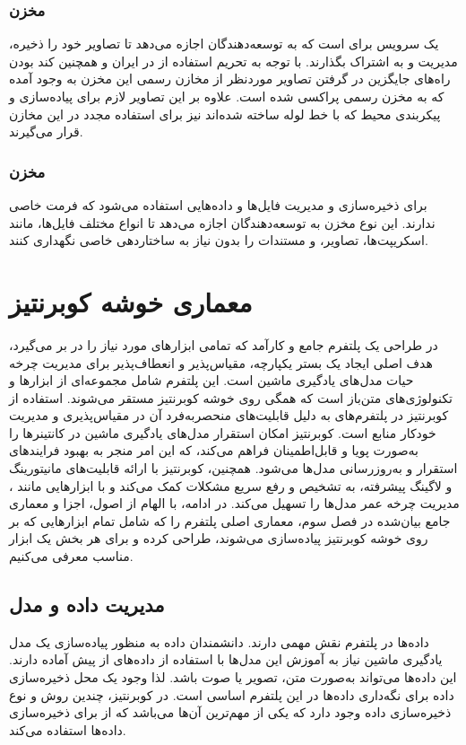 \subsubsection{مخزن }
یک سرویس برای  است که به توسعه‌دهندگان اجازه می‌دهد تا تصاویر خود را ذخیره، مدیریت و به اشتراک بگذارند. با توجه به تحریم استفاده از  در ایران و همچنین کند بودن راه‌های جایگزین در گرفتن تصاویر موردنظر از مخازن رسمی این مخزن به وجود آمده که به مخزن رسمی  پراکسی شده است. علاوه بر این تصاویر لازم برای پیاده‌سازی و پیکربندی محیط که با خط لوله  ساخته شده‌اند نیز برای استفاده مجدد در این مخازن قرار می‌گیرند.
\subsubsection{مخزن }
برای ذخیره‌سازی و مدیریت فایل‌ها و داده‌هایی استفاده می‌شود که فرمت خاصی ندارند. این نوع مخزن به توسعه‌دهندگان اجازه می‌دهد تا انواع مختلف فایل‌ها، مانند اسکریپت‌ها، تصاویر، و مستندات را بدون نیاز به ساختاردهی خاصی نگهداری کنند.


\section{معماری خوشه کوبرنتیز}
در طراحی یک پلتفرم  جامع و کارآمد که تمامی ابزارهای مورد نیاز را در بر می‌گیرد، هدف اصلی ایجاد یک بستر یکپارچه، مقیاس‌پذیر و انعطاف‌پذیر برای مدیریت چرخه حیات مدل‌های یادگیری ماشین است. این پلتفرم شامل مجموعه‌ای از ابزارها و تکنولوژی‌های متن‌باز است که همگی روی خوشه کوبرنتیز مستقر می‌شوند. استفاده از کوبرنتیز در پلتفرم‌های  به دلیل قابلیت‌های منحصربه‌فرد آن در مقیاس‌پذیری و مدیریت خودکار منابع است. کوبرنتیز امکان استقرار مدل‌های یادگیری ماشین در کانتینرها را به‌صورت پویا و قابل‌اطمینان فراهم می‌کند، که این امر منجر به بهبود فرایندهای استقرار و به‌روزرسانی مدل‌ها می‌شود. همچنین، کوبرنتیز با ارائه قابلیت‌های مانیتورینگ و لاگینگ پیشرفته، به تشخیص و رفع سریع مشکلات کمک می‌کند و با ابزارهایی مانند ، مدیریت چرخه عمر مدل‌ها را تسهیل می‌کند. در ادامه، با الهام از اصول، اجزا و معماری جامع بیان‌شده در فصل سوم، معماری اصلی پلتفرم  را که شامل تمام ابزارهایی که بر روی خوشه کوبرنتیز پیاده‌سازی می‌شوند، طراحی کرده و برای هر بخش یک ابزار مناسب معرفی می‌کنیم.


\subsection{مدیریت داده و مدل}
داده‌ها در پلتفرم  نقش مهمی دارند. دانشمندان داده به منظور پیاده‌سازی یک مدل یادگیری ماشین نیاز به آموزش این مدل‌ها با استفاده از داده‌های از پیش آماده دارند. این داده‌ها می‌تواند به‌صورت متن، تصویر یا صوت باشد. لذا وجود یک محل ذخیره‌سازی داده برای نگه‌داری داده‌ها در این پلتفرم اساسی است. در کوبرنتیز، چندین روش و نوع ذخیره‌سازی داده وجود دارد که یکی از مهم‌ترین آن‌ها  می‌باشد که از  برای ذخیره‌سازی داده‌ها استفاده می‌کند.
 

